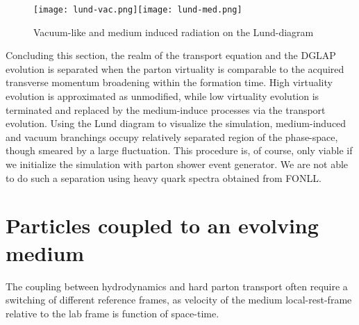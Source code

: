 \begin{figure}
\texttt{[image: lund-vac.png]}\texttt{[image: lund-med.png]}
\caption{Vacuum-like and medium induced radiation on the Lund-diagram}
\label{fig:lund}
\end{figure}

Concluding this section, the realm of the transport equation and the DGLAP evolution is separated when the parton virtuality is comparable to the acquired transverse momentum broadening within the formation time.
High virtuality evolution is approximated as unmodified, while low virtuality evolution is terminated and replaced by the medium-induce processes via the transport evolution. 
Using the Lund diagram to visualize the simulation, medium-induced and vacuum branchings occupy relatively separated region of the phase-space, though smeared by a large fluctuation.
This procedure is, of course, only viable if we initialize the simulation with parton shower event generator.
We are not able to do such a separation using heavy quark spectra obtained from FONLL.

\section{Particles coupled to an evolving medium}
\label{section:couple-to-hydro}
The coupling between hydrodynamics and hard parton transport often require a switching of different reference frames, as velocity of the medium local-rest-frame relative to the lab frame is function of space-time.

